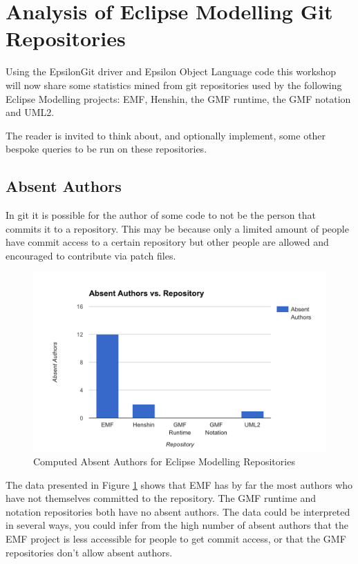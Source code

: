 \documentclass[runningheads,a4paper]{llncs}
\begin{document}
\section{Analysis of Eclipse Modelling Git Repositories}
Using the EpsilonGit driver and Epsilon Object Language code this workshop will now share some statistics mined from git repositories used by the following Eclipse Modelling projects: EMF, Henshin, the GMF runtime, the GMF notation and UML2.

The reader is invited to think about, and optionally implement, some other bespoke queries to be run on these repositories.

\subsection{Absent Authors}
In git it is possible for the author of some code to not be the person that commits it to a repository. This may be because only a limited amount of people have commit access to a certain repository but other people are allowed and encouraged to contribute via patch files. 

\begin{figure}[h]
	\centering
	\includegraphics[width=\textwidth]{../thesis/images/absentauthors}
	\caption{Computed Absent Authors for Eclipse Modelling Repositories}
	\label{fig:aa}
\end{figure} 

The data presented in Figure \ref{fig:aa} shows that EMF has by far the most authors who have not themselves committed to the repository. The GMF runtime and notation repositories both have no absent authors. The data could be interpreted in several ways, you could infer from the high number of absent authors that the EMF project is less accessible for people to get commit access, or that the GMF repositories don't allow absent authors.
\end{document}

